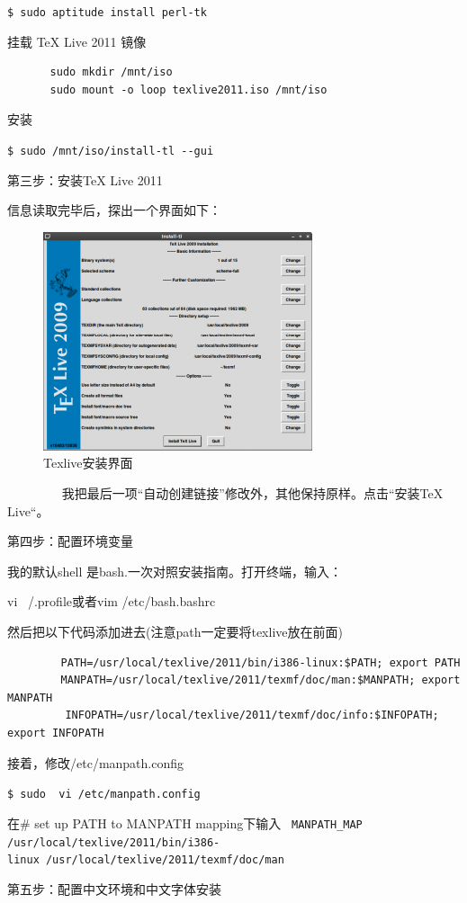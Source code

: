 \verb"$ sudo aptitude install perl-tk"

挂载 TeX Live 2011 镜像
\begin{verbatim}
　　　　sudo mkdir /mnt/iso
　　　　sudo mount -o loop texlive2011.iso /mnt/iso
\end{verbatim}

安装

\verb"$ sudo /mnt/iso/install-tl --gui"

第三步：安装TeX Live 2011

信息读取完毕后，探出一个界面如下：
\begin{figure}
\centering\includegraphics[scale=0.7]{figures/texlive.png}
\caption{Texlive安装界面}\label{texlive}
\end{figure}
　　　　
我把最后一项“自动创建链接”修改外，其他保持原样。点击“安装TeX Live“。

第四步：配置环境变量

我的默认shell 是bash.一次对照安装指南。打开终端，输入：

vi ~/.profile或者vim /etc/bash.bashrc

然后把以下代码添加进去(注意path一定要将texlive放在前面)
\begin{verbatim}
　　     PATH=/usr/local/texlive/2011/bin/i386‐linux:$PATH; export PATH
　　     MANPATH=/usr/local/texlive/2011/texmf/doc/man:$MANPATH; export MANPATH
         INFOPATH=/usr/local/texlive/2011/texmf/doc/info:$INFOPATH; export INFOPATH
\end{verbatim}

接着，修改/etc/manpath.config    

\verb"$ sudo  vi /etc/manpath.config"

在\# set up PATH to MANPATH mapping下输入
\verb" MANPATH_MAP /usr/local/texlive/2011/bin/i386-linux /usr/local/texlive/2011/texmf/doc/man"

第五步：配置中文环境和中文字体安装

